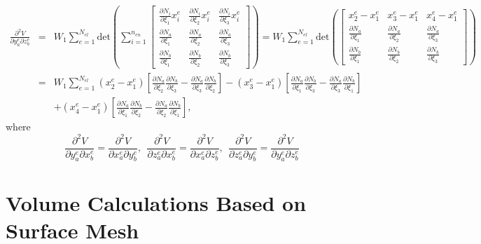 \begin{eqnarray}
\frac{\partial^2 V}{\partial y_a^e \partial z_b^e} &=& W_1\sum_{e=1}^{N_{el}} \text{det}\left(\sum_{i=1}^{n_{en}} \begin{bmatrix}
\frac{\partial N_i}{\partial \xi_1}x_i^e  & \frac{\partial N_i}{\partial \xi_2}x_i^e & \frac{\partial N_i}{\partial \xi_3}x_i^e \\
%
\frac{\partial N_a}{\partial \xi_1} & \frac{\partial N_a}{\partial \xi_2} & \frac{\partial N_a}{\partial \xi_3}  \\
%
 \frac{\partial N_b}{\partial \xi_1}  & \frac{\partial N_b}{\partial \xi_2} & \frac{\partial N_b}{\partial \xi_3}
\end{bmatrix}\right) 
%
= W_1\sum_{e=1}^{N_{el}} \text{det}\left(\begin{bmatrix}
x_2^e - x_1^e & x_3^e - x_1^e & x_4^e - x_1^e \\
%
\frac{\partial N_a}{\partial \xi_1} & \frac{\partial N_a}{\partial \xi_2} & \frac{\partial N_a}{\partial \xi_3}  \\
%
 \frac{\partial N_b}{\partial \xi_1}  & \frac{\partial N_b}{\partial \xi_2} & \frac{\partial N_b}{\partial \xi_3}
\end{bmatrix}\right) \nonumber\\
&=&W_1\sum_{e=1}^{N_{el}}(x_2^e - x_1^e)\left[\frac{\partial N_a}{\partial \xi_2}\frac{\partial N_b}{\partial \xi_3}-\frac{\partial N_a}{\partial \xi_3}\frac{\partial N_b}{\partial \xi_2}\right] 
%
-(x_3^e - x_1^e)\left[\frac{\partial N_a}{\partial \xi_1}\frac{\partial N_b}{\partial \xi_3}-\frac{\partial N_a}{\partial \xi_3}\frac{\partial N_b}{\partial \xi_1}\right] \nonumber\\
%
&&+(x_4^e - x_1^e)\left[\frac{\partial N_a}{\partial \xi_1}\frac{\partial N_b}{\partial \xi_2}-\frac{\partial N_a}{\partial \xi_2}\frac{\partial N_b}{\partial \xi_1}\right],
\label{eq:dV-offdiag}
\end{eqnarray}
%
where 
%
\begin{equation}
\frac{\partial^2 V}{\partial y_a^e \partial x_b^e} = \frac{\partial^2 V}{\partial x_a^e \partial y_b^e}, \ \
%
\frac{\partial^2 V}{\partial z_a^e \partial x_b^e} = \frac{\partial^2 V}{\partial x_a^e \partial z_b^e}, \ \
%
\frac{\partial^2 V}{\partial z_a^e \partial y_b^e} = \frac{\partial^2 V}{\partial y_a^e \partial z_b^e}
\end{equation}

\section{Volume Calculations Based on Surface Mesh}

